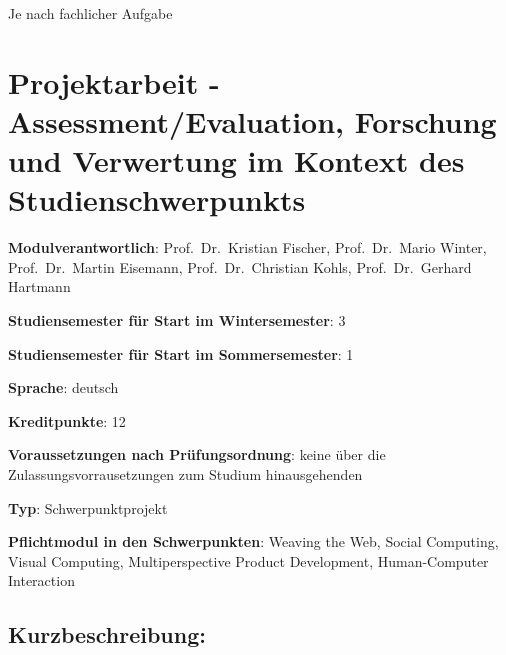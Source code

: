 Je nach fachlicher Aufgabe

\chapter{Projektarbeit - Assessment/Evaluation, Forschung und Verwertung
im Kontext des
Studienschwerpunkts\label{/mi-2017/modulbeschreibungen-master/MA_Modul_Projekt_Verwertung}}\label{projektarbeit---assessmentevaluation-forschung-und-verwertung-im-kontext-des-studienschwerpunktspathlabelmi-2017modulbeschreibungen-mastermaux5fmodulux5fprojektux5fverwertung}

\begin{modulHead}
\textbf{Modulverantwortlich}: Prof.~Dr.~Kristian
Fischer, Prof.~Dr.~Mario Winter, Prof.~Dr.~Martin Eisemann,
Prof.~Dr.~Christian Kohls, Prof.~Dr.~Gerhard
Hartmann
\end{modulHead}
\begin{modulHead}
\textbf{Studiensemester für
Start im Wintersemester}:
3
\end{modulHead}
\begin{modulHead}
\textbf{Studiensemester für Start
im Sommersemester}:
1
\end{modulHead}
\begin{modulHead}
\textbf{Sprache}:
deutsch
\end{modulHead}
\begin{modulHead}
\textbf{Kreditpunkte}:
12
\end{modulHead}
\begin{modulHead}
\textbf{Voraussetzungen nach
Prüfungsordnung}: keine über die Zulassungsvorrausetzungen zum Studium
hinausgehenden
\end{modulHead}
\begin{modulHead}
\textbf{Typ}:
Schwerpunktprojekt
\end{modulHead}
\begin{modulHead}
\textbf{Pflichtmodul
in den Schwerpunkten}: Weaving the Web, Social Computing, Visual
Computing, Multiperspective Product Development, Human-Computer
Interaction
\end{modulHead}


\section*{Kurzbeschreibung:\label{/mi-2017/modulbeschreibungen-master/MA_Modul_Projekt_Verwertung}}\label{kurzbeschreibungpathlabelmi-2017modulbeschreibungen-mastermaux5fmodulux5fprojektux5fverwertung}

